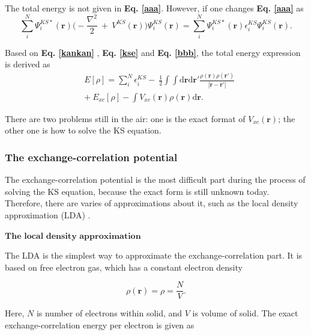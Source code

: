 \documentclass[a4paper, 12pt, titlepage,oneside,drop]{kthesis}
\begin{document}
The total energy is not given in \textbf{Eq. \ref{aaa}}. However, if one changes \textbf{Eq. \ref{aaa}} as 
\begin{equation}\label{bbb}
\sum\limits_i^N \Psi^{{KS}*}_{{i}}(\textbf{r}) \Big(-\frac{\nabla^{2}}{2}\ + \ V^{KS}(\textbf{r})\Big) \Psi^{{KS}}_{{i}}(\textbf{r}) = \sum\limits_i^N \Psi^{{KS}*}_{{i}}(\textbf{r}) \epsilon^{{KS}}_{{i}}  \Psi^{{KS}}_{{i}}(\textbf{r}).
\end{equation}

Based on \textbf{Eq. \ref{kankan}} , \textbf{Eq. \ref{kse}} and \textbf{Eq. \ref{bbb}}, the total energy expression is derived as
\begin{equation}\label{totalenergy}
\begin{split}
& E[\rho] = \sum\limits_i^N \epsilon^{{KS}}_{{i}} - \ \frac{1}{2} \int \int \mathrm{d} {\textbf{r}} \mathrm{d}{\textbf{r}'} \frac{\rho({\textbf{r}})\rho(\textbf{r}')}{|{\textbf{r}}-{\textbf{r}}'|} \\
&    + \ E_{xc}[\rho] - \int   V_{xc}(\textbf{r}) \rho({\textbf{r}}) \mathrm{d} {\textbf{r}}.
\end{split}
\end{equation}

There are two problems still in the air: one is the exact format of $V_{xc}(\textbf{r})$; the other one is how to solve the KS equation.

\subsubsection{The exchange-correlation potential}

The exchange-correlation potential is the most difficult part during the process of solving the KS equation, because the exact form is still unknown today. Therefore, there
 are varies of approximations about it, such as the local density approximation (LDA) \cite{martin2004electronic, Cottenierwien2k, kohn1965self, von1972local, hedin1971explicit}.

$\textbf{The local density approximation}$

The LDA is the simplest way to approximate the exchange-correlation part. It is based on free electron gas, which has a constant electron density 

\begin{equation}
 \rho(\textbf{r}) = \rho = \frac{N}{V}.
\end{equation}

Here, $N$ is number of electrons within solid, and $V$ is volume of solid. The exact exchange-correlation energy per electron is given as
\end{document}
